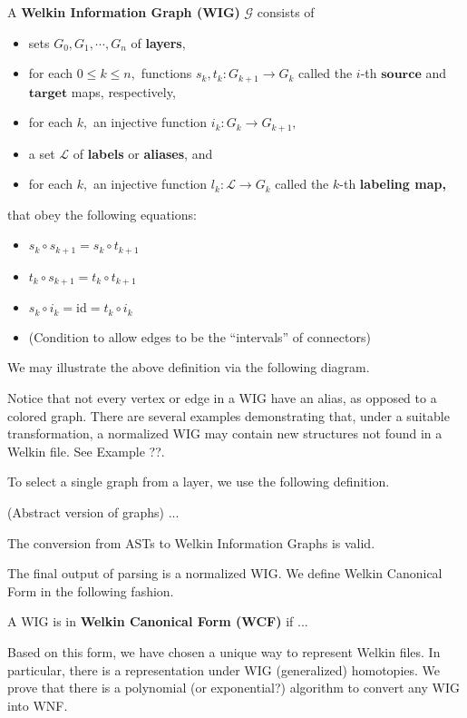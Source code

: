 \begin{definition}
	A \textbf{Welkin Information Graph (WIG)} $\mathcal{G}$ consists of
  \begin{itemize}
    \item sets $G_{0}, G_{1}, \cdots, G_{n}$ of \textbf{layers},
    \item for each $0 \leq k \leq n,$ functions $s_{k}, t_{k}: G_{k+1} \to G_{k}$ called the $i$-th $\textbf{source}$ and $\textbf{target}$ maps, respectively,
    \item for each $k,$ an injective function $i_{k}: G_{k} \to G_{k+1},$
    \item a set $\mathcal{L}$ of \textbf{labels} or \textbf{aliases}, and
    \item for each $k,$ an injective function $l_{k}: \mathcal{L} \to G_{k}$ called the $k$-th \textbf{labeling map,}
  \end{itemize}
  that obey the following equations:
  \begin{itemize}
    \item $s_{k} \circ s_{k+1} = s_{k} \circ t_{k+1}$
    \item $t_{k} \circ s_{k+1} = t_{k} \circ t_{k+1}$
    \item $s_{k} \circ i_{k} = \textrm{id} = t_{k} \circ i_{k} $
    \item (Condition to allow edges to be the ``intervals'' of connectors)
  \end{itemize}
  We may illustrate the above definition via the following diagram.
\end{definition}
Notice that not every vertex or edge in a WIG have an alias, as opposed to a colored graph. There are several examples demonstrating that, under a suitable transformation, a normalized WIG may contain new structures not found in a Welkin file. See Example ??.

To select a single graph from a layer, we use the following definition.
\begin{definition} (Abstract version of graphs) ...
\end{definition}
\begin{lemma}
The conversion from ASTs to Welkin Information Graphs is valid.
\end{lemma}
The final output of parsing is a normalized WIG. We define Welkin Canonical Form in the following fashion.
\begin{definition}
A WIG is in \textbf{Welkin Canonical Form (WCF)} if ...
\end{definition}
Based on this form, we have chosen a unique way to represent Welkin files. In particular, there is a representation under WIG (generalized) homotopies. We prove that there is a polynomial (or exponential?) algorithm to convert any WIG into WNF.

